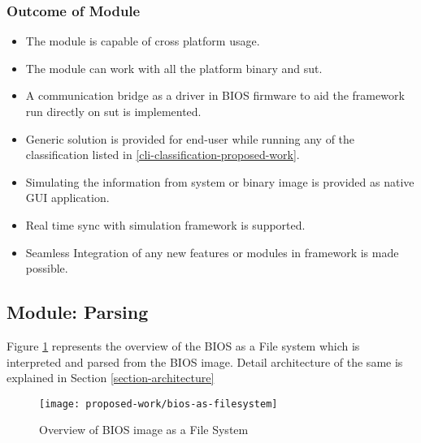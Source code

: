 

\subsubsection{Outcome of Module}
\begin{itemize}
	\item The module is capable of cross platform usage.
	\item The module can work with all the platform binary and \gls{sut}.
	\item A communication bridge as a driver in BIOS firmware to aid the framework run directly on \gls{sut} is implemented.
	\item Generic solution is provided for end-user while running any of the classification listed in \ref{cli-classification-proposed-work}.
	\item Simulating the information from system or binary image is provided as native GUI application.
	\item Real time sync with simulation framework is supported.
	\item Seamless Integration of any new features or modules in framework is made possible.
\end{itemize}

\subsection{Module: Parsing}\label{module-parsing}
Figure \ref{fig:bios-as-filesystem} represents the overview of the BIOS as a File system  which is interpreted and parsed from the BIOS image. Detail architecture of the same is explained in Section \ref{section-architecture}

\begin{figure}[!htbp]
	\centering
	\texttt{[image: proposed-work/bios-as-filesystem]}
	\caption{Overview of BIOS image as a File System}\label{fig:bios-as-filesystem}
\end{figure}

